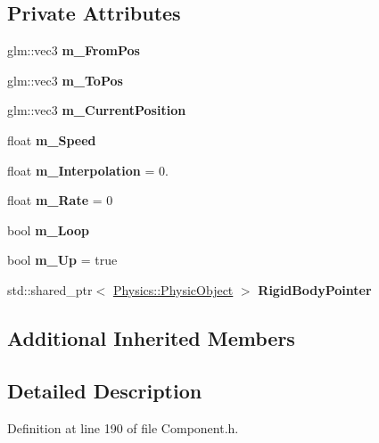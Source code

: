 \subsection*{Private Attributes}
\begin{DoxyCompactItemize}
\item 
glm\+::vec3 {\bfseries m\+\_\+\+From\+Pos}\hypertarget{class_component_1_1_movement_component_a913f49050c271f40c635900a8364b990}{}\label{class_component_1_1_movement_component_a913f49050c271f40c635900a8364b990}

\item 
glm\+::vec3 {\bfseries m\+\_\+\+To\+Pos}\hypertarget{class_component_1_1_movement_component_a55459f63b8f84585ca42845e47085850}{}\label{class_component_1_1_movement_component_a55459f63b8f84585ca42845e47085850}

\item 
glm\+::vec3 {\bfseries m\+\_\+\+Current\+Position}\hypertarget{class_component_1_1_movement_component_a143468d3c1da30b835a9c51091997157}{}\label{class_component_1_1_movement_component_a143468d3c1da30b835a9c51091997157}

\item 
float {\bfseries m\+\_\+\+Speed}\hypertarget{class_component_1_1_movement_component_adfc2edc51bd54b5daae98fc319af9b73}{}\label{class_component_1_1_movement_component_adfc2edc51bd54b5daae98fc319af9b73}

\item 
float {\bfseries m\+\_\+\+Interpolation} = 0.\hypertarget{class_component_1_1_movement_component_a08898c15892ff8485f2f2259b05b19bb}{}\label{class_component_1_1_movement_component_a08898c15892ff8485f2f2259b05b19bb}

\item 
float {\bfseries m\+\_\+\+Rate} = 0\hypertarget{class_component_1_1_movement_component_ad90bea23bdfedafea327a4ab23dc8eed}{}\label{class_component_1_1_movement_component_ad90bea23bdfedafea327a4ab23dc8eed}

\item 
bool {\bfseries m\+\_\+\+Loop}\hypertarget{class_component_1_1_movement_component_a5715fbcb6bf7974e19beff59c9dbb8bd}{}\label{class_component_1_1_movement_component_a5715fbcb6bf7974e19beff59c9dbb8bd}

\item 
bool {\bfseries m\+\_\+\+Up} = true\hypertarget{class_component_1_1_movement_component_a6a53b693a165e98b296fd7b3310478fb}{}\label{class_component_1_1_movement_component_a6a53b693a165e98b296fd7b3310478fb}

\item 
std\+::shared\+\_\+ptr$<$ \hyperlink{class_physics_1_1_physic_object}{Physics\+::\+Physic\+Object} $>$ {\bfseries Rigid\+Body\+Pointer}\hypertarget{class_component_1_1_movement_component_a6b7b7072e627dc861bb55e5e291cde5b}{}\label{class_component_1_1_movement_component_a6b7b7072e627dc861bb55e5e291cde5b}

\end{DoxyCompactItemize}
\subsection*{Additional Inherited Members}


\subsection{Detailed Description}


Definition at line 190 of file Component.\+h.

